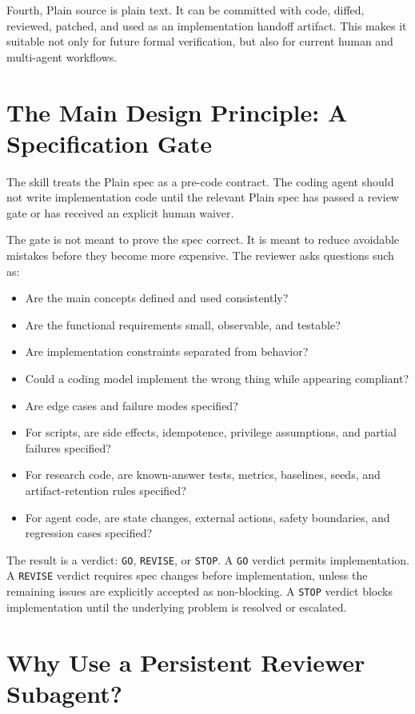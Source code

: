 \documentclass[11pt]{article}
\begin{document}
Fourth, Plain source is plain text. It can be committed with code, diffed,
reviewed, patched, and used as an implementation handoff artifact. This makes it
suitable not only for future formal verification, but also for current human and
multi-agent workflows.

\section{The Main Design Principle: A Specification Gate}

The skill treats the Plain spec as a pre-code contract. The coding agent should
not write implementation code until the relevant Plain spec has passed a review
gate or has received an explicit human waiver.

The gate is not meant to prove the spec correct. It is meant to reduce avoidable
mistakes before they become more expensive. The reviewer asks questions such as:

\begin{itemize}[nosep]
\item Are the main concepts defined and used consistently?
\item Are the functional requirements small, observable, and testable?
\item Are implementation constraints separated from behavior?
\item Could a coding model implement the wrong thing while appearing compliant?
\item Are edge cases and failure modes specified?
\item For scripts, are side effects, idempotence, privilege assumptions, and
partial failures specified?
\item For research code, are known-answer tests, metrics, baselines, seeds, and
artifact-retention rules specified?
\item For agent code, are state changes, external actions, safety boundaries,
and regression cases specified?
\end{itemize}

The result is a verdict: \texttt{GO}, \texttt{REVISE}, or \texttt{STOP}. A
\texttt{GO} verdict permits implementation. A \texttt{REVISE} verdict requires
spec changes before implementation, unless the remaining issues are explicitly
accepted as non-blocking. A \texttt{STOP} verdict blocks implementation until the
underlying problem is resolved or escalated.

\section{Why Use a Persistent Reviewer Subagent?}
\end{document}
